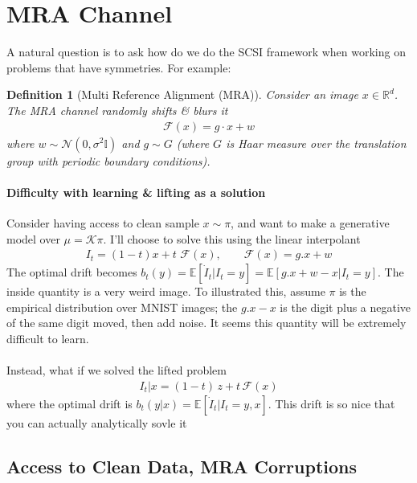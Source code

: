 \documentclass[12pt,fleqn]{article}
\numberwithin{equation}{section}
\newtheorem{definition}{Definition}
\begin{document}
\newpage
\section{MRA Channel}
A natural question is to ask how do we do the SCSI framework when working on problems that have symmetries. For example:

\begin{definition}
	[Multi Reference Alignment (MRA)] Consider an image $x \in \mathbb R^{d}$. The MRA channel randomly shifts \& blurs it
	\begin{align}
		\mathcal F(x) = g\cdot x + w
	\end{align}
	where $w \sim \mathcal N(0, \sigma^2\mathbb I)$ and $g \sim G$ (where $G$ is Haar measure over the translation group with periodic boundary conditions).	
\end{definition}

\paragraph{Difficulty with learning \& lifting as a solution}
Consider having access to clean sample $x \sim \pi$, and want to make a generative model over $\mu = \mathcal K \pi$. I'll choose to solve this using the linear interpolant
\begin{align}
	I_t = (1-t) x + t\, \mathcal \, \mathcal F(x), \qquad \mathcal F(x) = g.x + w 
\end{align}
The optimal drift becomes $b_t(y) = \mathbb E[\dot I_t | I_t = y] = \mathbb E[g . x + w - x | I_t = y]$. The inside quantity is a very weird image. To illustrated this, assume $\pi$ is the empirical distribution over MNIST images; the $g.x-x$ is the digit plus a negative of the same digit moved, then add noise. It seems this quantity will be extremely difficult to learn.\\
\\
Instead, what if we solved the lifted problem
\begin{align}
	I_t|x = (1-t) \, z + t\, \mathcal F(x)
\end{align} 
where the optimal drift is $b_t(y | x) = \mathbb E[\dot I_t | I_t = y , x]$. This drift is so nice that you can actually analytically sovle it

\subsection{Access to Clean Data, MRA Corruptions}
\end{document}
